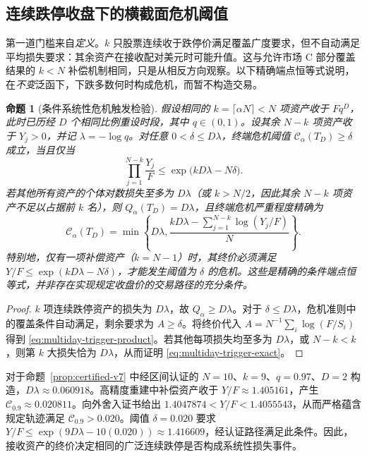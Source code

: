 \documentclass[11pt]{article}
\numberwithin{equation}{section}
\newtheorem{proposition}[theorem]{命题}
\theoremstyle{definition}
\theoremstyle{remark}
\newcommand{\Cris}{\mathcal{C}}
\begin{document}
\subsection{连续跌停收盘下的横截面危机阈值}\label{subsec:multiday-breadth}
第一道门槛来自\emph{定义}。$k$ 只股票连续收于跌停价满足覆盖广度要求，但不自动满足平均损失要求：其余资产在接收配对美元时可能升值。这与允许市场 C 部分覆盖结果的 $k<N$ 补偿机制相同，只是从相反方向观察。以下精确端点恒等式说明，在\emph{不变}泛函下，下跌多数何时构成危机，而暂不构造交易。
\begin{proposition}[条件系统性危机触发检验]\label{prop:multiday-crisis-trigger}
假设相同的 $k=\lceil\alpha N\rceil<N$ 项资产收于 $Fq^D$，此时已历经 $D$ 个相同比例重设时段，其中 $q\in(0,1)$。设其余 $N-k$ 项资产收于 $Y_j>0$，并记 $\lambda=-\log q$。对任意 $0<\delta\le D\lambda$，\emph{终端}危机阈值 $\Cris_\alpha(T_D)\ge\delta$ 成立，当且仅当
\begin{equation}\label{eq:multiday-trigger-product}
\boxed{\qquad \prod_{j=1}^{N-k}\frac{Y_j}{F}
 \le\exp\bigl(kD\lambda-N\delta\bigr).\qquad}
\end{equation}
若其他所有资产的个体对数损失至多为 $D\lambda$（或 $k>N/2$，因此其余 $N-k$ 项资产不足以占据前 $k$ 名），则 $Q_\alpha(T_D)=D\lambda$，且终端危机严重程度精确为
\begin{equation}\label{eq:multiday-trigger-exact}
\boxed{\quad\Cris_\alpha(T_D)=\min\!\left\{D\lambda,
 \frac{kD\lambda-\sum_{j=1}^{N-k}\log(Y_j/F)}{N}\right\}.\quad}
\end{equation}
特别地，仅有一项补偿资产（$k=N-1$）时，其终价必须满足 $Y/F\le\exp(kD\lambda-N\delta)$，才能发生阈值为 $\delta$ 的危机。这些是精确的\emph{条件端点恒等式}，并非存在实现规定收盘价的交易路径的充分条件。
\end{proposition}
\begin{proof}
$k$ 项连续跌停资产的损失为 $D\lambda$，故 $Q_\alpha\ge D\lambda$。对于 $\delta\le D\lambda$，危机准则中的覆盖条件自动满足，剩余要求为 $A\ge\delta$。将终价代入 $A=N^{-1}\sum_i\log(F/S_i)$ 得到 \eqref{eq:multiday-trigger-product}。若其他每项损失均至多为 $D\lambda$，或 $N-k<k$，则第 $k$ 大损失恰为 $D\lambda$，从而证明 \eqref{eq:multiday-trigger-exact}。
\end{proof}
对于命题~\ref{prop:certified-v7} 中经区间认证的 $N=10$、$k=9$、$q=0.97$、$D=2$ 构造，$D\lambda\approx0.060918$。高精度重建中补偿资产收于 $Y/F\approx1.405161$，产生 $\Cris_{0.9}\approx0.020811$。向外舍入证书给出 $1.4047874<Y/F<1.4055543$，从而严格蕴含规定轨迹满足 $\Cris_{0.9}>0.020$。阈值 $\delta=0.020$ 要求 $Y/F\le\exp(9D\lambda-10(0.020))\approx1.416609$，经认证路径满足此条件。因此，接收资产的终价决定相同的广泛连续跌停是否构成系统性损失事件。
\end{document}
